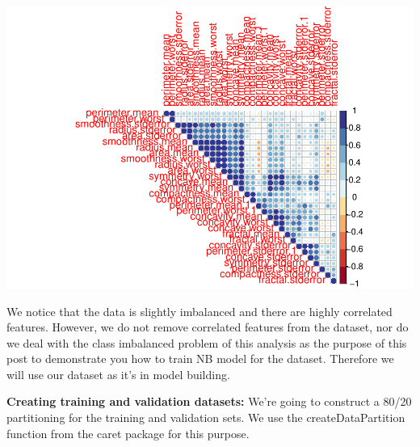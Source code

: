 \documentclass[]{article}
\newenvironment{Shaded}{\begin{snugshade}}{\end{snugshade}}
\newcommand{\CommentTok}[1]{\textcolor[rgb]{0.56,0.35,0.01}{\textit{#1}}}
\newcommand{\DataTypeTok}[1]{\textcolor[rgb]{0.13,0.29,0.53}{#1}}
\newcommand{\DecValTok}[1]{\textcolor[rgb]{0.00,0.00,0.81}{#1}}
\newcommand{\FloatTok}[1]{\textcolor[rgb]{0.00,0.00,0.81}{#1}}
\newcommand{\KeywordTok}[1]{\textcolor[rgb]{0.13,0.29,0.53}{\textbf{#1}}}
\newcommand{\NormalTok}[1]{#1}
\newcommand{\OperatorTok}[1]{\textcolor[rgb]{0.81,0.36,0.00}{\textbf{#1}}}
\newcommand{\OtherTok}[1]{\textcolor[rgb]{0.56,0.35,0.01}{#1}}
\newcommand{\StringTok}[1]{\textcolor[rgb]{0.31,0.60,0.02}{#1}}
\begin{document}
\includegraphics{Breast-cancer_files/figure-latex/unnamed-chunk-1-1.pdf}

We notice that the data is slightly imbalanced and there are highly
correlated features. However, we do not remove correlated features from
the dataset, nor do we deal with the class imbalanced problem of this
analysis as the purpose of this post to demonstrate you how to train NB
model for the dataset. Therefore we will use our dataset as it's in
model building.

\textbf{Creating training and validation datasets:} We're going to
construct a 80/20 partitioning for the training and validation sets. We
use the createDataPartition function from the caret package for this
purpose.

\begin{Shaded}
\end{Shaded}
\end{document}

